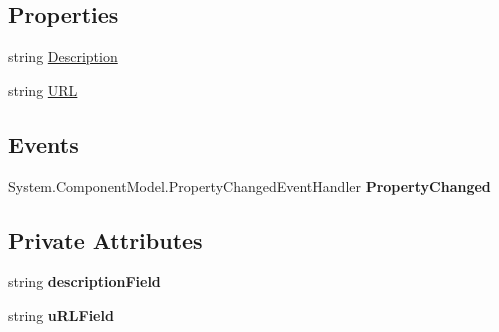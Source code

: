 \subsection*{Properties}
\begin{DoxyCompactItemize}
\item 
\hypertarget{class_price___comparison_1_1amazon_1_1ecs_1_1_item_link_a22af61d434193d33986e8d8ee18d15f4}{string \hyperlink{class_price___comparison_1_1amazon_1_1ecs_1_1_item_link_a22af61d434193d33986e8d8ee18d15f4}{Description}}\label{class_price___comparison_1_1amazon_1_1ecs_1_1_item_link_a22af61d434193d33986e8d8ee18d15f4}

\begin{DoxyCompactList}\small\item\em \end{DoxyCompactList}\item 
\hypertarget{class_price___comparison_1_1amazon_1_1ecs_1_1_item_link_a87c0e38b2a7b87502b0d53ee6d457e7b}{string \hyperlink{class_price___comparison_1_1amazon_1_1ecs_1_1_item_link_a87c0e38b2a7b87502b0d53ee6d457e7b}{U\-R\-L}}\label{class_price___comparison_1_1amazon_1_1ecs_1_1_item_link_a87c0e38b2a7b87502b0d53ee6d457e7b}

\begin{DoxyCompactList}\small\item\em \end{DoxyCompactList}\end{DoxyCompactItemize}
\subsection*{Events}
\begin{DoxyCompactItemize}
\item 
\hypertarget{class_price___comparison_1_1amazon_1_1ecs_1_1_item_link_ab6de54182d3d4eb652a48dc5be2eb8b2}{System.\-Component\-Model.\-Property\-Changed\-Event\-Handler {\bfseries Property\-Changed}}\label{class_price___comparison_1_1amazon_1_1ecs_1_1_item_link_ab6de54182d3d4eb652a48dc5be2eb8b2}

\end{DoxyCompactItemize}
\subsection*{Private Attributes}
\begin{DoxyCompactItemize}
\item 
\hypertarget{class_price___comparison_1_1amazon_1_1ecs_1_1_item_link_a36ca98a3fd34302b2c4051373e51d0c7}{string {\bfseries description\-Field}}\label{class_price___comparison_1_1amazon_1_1ecs_1_1_item_link_a36ca98a3fd34302b2c4051373e51d0c7}

\item 
\hypertarget{class_price___comparison_1_1amazon_1_1ecs_1_1_item_link_a7a5e046b5d2218d1d437e78aad1a9aed}{string {\bfseries u\-R\-L\-Field}}\label{class_price___comparison_1_1amazon_1_1ecs_1_1_item_link_a7a5e046b5d2218d1d437e78aad1a9aed}

\end{DoxyCompactItemize}


